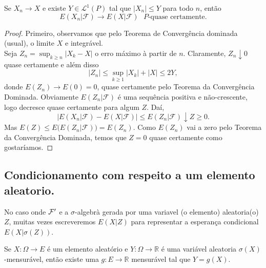 \begin{theorem}
  Se $X_n \to X$ e existe $Y \in \mathcal{L}^1(P)$ tal que $|X_n| \leq Y$ para todo $n$, então
  \begin{equation}
    E(X_n | \mathcal{F}) \to E(X|\mathcal{F}) \text{ $P$-quase certamente.}
  \end{equation}
\end{theorem}

\begin{proof}
Primeiro, observamos que pelo Teorema de Convergência dominada (usual), o limite $X$ e integrável.\\

Seja $Z_n = \sup_{k \geq n} |X_k - X|$ o erro máximo à partir de $n$.
Claramente, $Z_n \downarrow 0$ quase certamente e além disso
  \begin{equation}
    |Z_n| \leq \sup_{k \geq 1} |X_k| + |X| \leq 2 Y,
  \end{equation}
  donde $E(Z_n) \to E(0) = 0$, quase certamente pelo Teorema da Convergência Dominada.
Obviamente $E(Z_n|\mathcal{F})$ é uma sequência positiva e não-crescente, logo decresce quase certamente para algum $Z$.
  Daí,
  \begin{equation}
    \big| E(X_n | \mathcal{F}) - E(X | \mathcal{F}) \big| \leq E(Z_n | \mathcal{F}) \downarrow Z \geq 0.
  \end{equation}
  Mas $E(Z) \leq E\big( E(Z_n|\mathcal{F}) \big) = E(Z_n)$.
  Como $E(Z_n)$ vai a zero pelo Teorema da Convergência Dominada, temos que $Z = 0$ quase certamente como gostaríamos.
\end{proof}

\subsection{Condicionamento com respeito a um elemento aleatorio.}

No caso onde ${\mathcal F}'$ e a $\sigma$-algebrà gerada por uma variavel (o elemento) aleatoria(o) $Z$, muitas vezes escreveremos $E(X|Z)$ para representar a esperança condicional $E(X|\sigma(Z))$.


\begin{lemma}
  \label{l:f_g_circ_X}
  Se $X: \Omega \to E$ é um elemento aleatório e $Y:\Omega \to \mathbb{R}$ é uma variável aleatoria $\sigma(X)$-mensurável,
  então existe uma $g:E \to \mathbb{R}$ mensurável tal que $Y = g(X)$.
\end{lemma}

